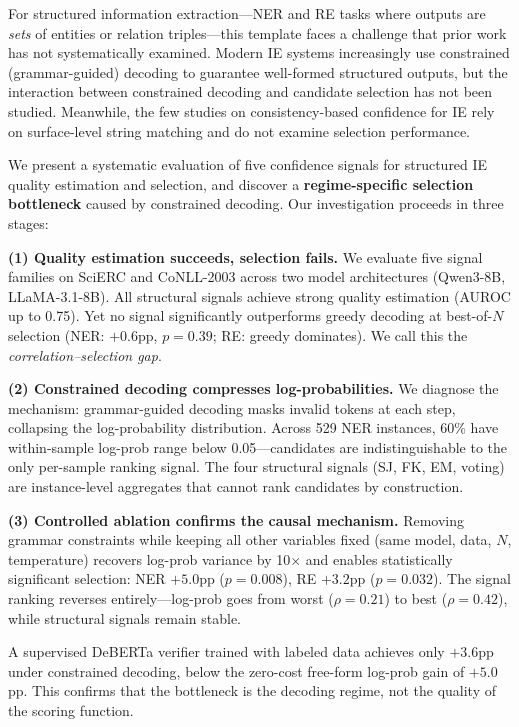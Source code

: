\documentclass[11pt,a4paper]{article}
\begin{document}
For structured information extraction---NER and RE tasks where outputs are \emph{sets} of entities or relation triples---this template faces a challenge that prior work has not systematically examined. Modern IE systems increasingly use constrained (grammar-guided) decoding \citep{willard2023efficient} to guarantee well-formed structured outputs, but the interaction between constrained decoding and candidate selection has not been studied. Meanwhile, the few studies on consistency-based confidence for IE \citep{nedellec2026consistency} rely on surface-level string matching and do not examine selection performance.

We present a systematic evaluation of five confidence signals for structured IE quality estimation and selection, and discover a \textbf{regime-specific selection bottleneck} caused by constrained decoding. Our investigation proceeds in three stages:

\textbf{(1) Quality estimation succeeds, selection fails.} We evaluate five signal families on SciERC and CoNLL-2003 across two model architectures (Qwen3-8B, LLaMA-3.1-8B). All structural signals achieve strong quality estimation (AUROC up to 0.75). Yet no signal significantly outperforms greedy decoding at best-of-$N$ selection (NER: $+0.6$pp, $p = 0.39$; RE: greedy dominates). We call this the \emph{correlation--selection gap}.

\textbf{(2) Constrained decoding compresses log-probabilities.} We diagnose the mechanism: grammar-guided decoding masks invalid tokens at each step, collapsing the log-probability distribution. Across 529 NER instances, 60\% have within-sample log-prob range below 0.05---candidates are indistinguishable to the only per-sample ranking signal. The four structural signals (SJ, FK, EM, voting) are instance-level aggregates that cannot rank candidates by construction.

\textbf{(3) Controlled ablation confirms the causal mechanism.} Removing grammar constraints while keeping all other variables fixed (same model, data, $N$, temperature) recovers log-prob variance by 10$\times$ and enables statistically significant selection: NER $+5.0$pp ($p = 0.008$), RE $+3.2$pp ($p = 0.032$). The signal ranking reverses entirely---log-prob goes from worst ($\rho = 0.21$) to best ($\rho = 0.42$), while structural signals remain stable.

A supervised DeBERTa verifier trained with labeled data achieves only $+3.6$pp under constrained decoding, below the zero-cost free-form log-prob gain of $+5.0$pp. This confirms that the bottleneck is the decoding regime, not the quality of the scoring function.
\end{document}
